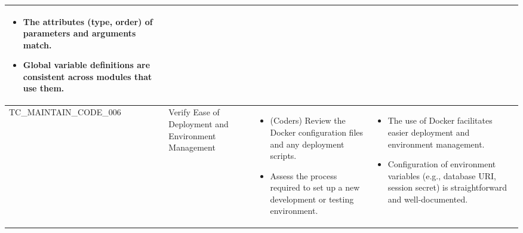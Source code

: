 \documentclass[10pt, a4paper]{report}
\begin{document}
\begin{longtable}{|>{\small\raggedright\arraybackslash}p{4cm}|>{\raggedright\arraybackslash}p{3cm}|>{\raggedright\arraybackslash}p{5cm}|>{\raggedright\arraybackslash}p{5cm}|}
\begin{itemize}[noitemsep, topsep=0pt, partopsep=0pt, leftmargin=*]
        \item The attributes (type, order) of parameters and arguments match.
        \item Global variable definitions are consistent across modules that use them.
    \end{itemize} \\ \hline
TC\_MAINTAIN\_CODE\_006 & Verify Ease of Deployment and Environment Management & 
    \begin{itemize}[noitemsep, topsep=0pt, partopsep=0pt, leftmargin=*]
        \item (Coders) Review the Docker configuration files and any deployment scripts.
        \item Assess the process required to set up a new development or testing environment.
    \end{itemize} & 
    \begin{itemize}[noitemsep, topsep=0pt, partopsep=0pt, leftmargin=*]
        \item The use of Docker facilitates easier deployment and environment management.
        \item Configuration of environment variables (e.g., database URI, session secret) is straightforward and well-documented.
    \end{itemize} \\ \hline


\end{longtable}
\end{document}
